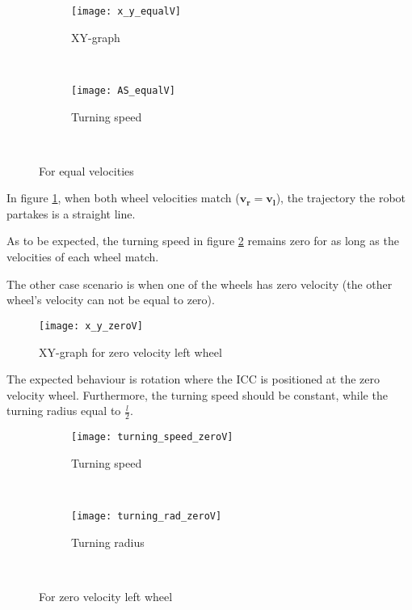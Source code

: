 {\begin{figure}[h]
    \centering
    \begin{subfigure}[h]{0.47\textwidth}
        \texttt{[image: x\_y\_equalV]}
        \caption{XY-graph}
        \label{fig:v_l=v_r}
    \end{subfigure}
    ~ %
    \begin{subfigure}[h]{0.47\textwidth}
        \texttt{[image: AS\_equalV]}
        \caption{Turning speed}
        \label{fig:Wv_l=v_r}
    \end{subfigure}
    ~ %
    \caption{For equal velocities}\label{fig:eqV}
\end{figure}

In figure \ref{fig:v_l=v_r}, when both wheel velocities match ($\boldsymbol{v_r = v_l}$), the trajectory the robot partakes is a straight line. 

As to be expected, the turning speed in figure \ref{fig:Wv_l=v_r} remains zero for as long as the velocities of each wheel match.

\newpage

The other case scenario is when one of the wheels has zero velocity (the other wheel's velocity can not be equal to zero).

\begin{figure}[h]
\centering
\texttt{[image: x\_y\_zeroV]}
\caption{XY-graph for zero velocity left wheel}
\label{fig::ZeroV}
\end{figure} 

The expected behaviour is rotation where the ICC is positioned at the zero velocity wheel. Furthermore, the turning speed should be constant, while the turning radius equal to $\frac{l}{2}$.

\begin{figure}[h]
    \centering
    \begin{subfigure}[h]{0.47\textwidth}
        \texttt{[image: turning\_speed\_zeroV]}
        \caption{Turning speed}
        \label{fig:TzeroV}
    \end{subfigure}
    ~ %
    \begin{subfigure}[h]{0.47\textwidth}
        \texttt{[image: turning\_rad\_zeroV]}
        \caption{Turning radius}
        \label{fig:RzeroV}
    \end{subfigure}
    ~ %
    \caption{For zero velocity left wheel}\label{fig:zeroV}
\end{figure}

}
